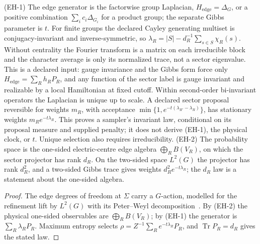 \documentclass[11pt]{article}
\begin{document}
(EH-1) The edge generator is the factorwise group Laplacian,
\(H_{\mathrm{edge}} = \Delta_G\), or a positive combination
\(\sum_ic_i\Delta_{G_i}\) for a product group; the separate Gibbs parameter is
\(t\). For finite groups the declared Cayley generating multiset is
conjugacy-invariant and inverse-symmetric, so
\(\lambda_R=|S|-d_R^{-1}\sum_{s\in S}\chi_R(s)\). Without centrality the
Fourier transform is a matrix on each irreducible block and the character
average is only its normalized trace, not a sector eigenvalue. This is a
declared input: gauge invariance and the Gibbs form force only
\(H_{\mathrm{edge}}=\sum_Rh_RP_R\), and any function of the sector label is
gauge invariant and realizable by a local Hamiltonian at fixed cutoff. Within
second-order bi-invariant operators the Laplacian is unique up to scale.
A declared sector proposal reversible for weights \(m_R\), with acceptance
\(\min\{1,e^{-t(\lambda_{R'}-\lambda_R)}\}\), has stationary weights
\(m_Re^{-t\lambda_R}\). This proves a sampler's invariant law, conditional
on its proposal measure and supplied penalty; it does not derive (EH-1),
the physical clock, or \(t\). Unique selection also requires irreducibility.
(EH-2) The probability space is the one-sided
electric-centre edge algebra \(\bigoplus_RB(V_R)\), on which the sector
projector has rank \(d_R\). On the two-sided space \(L^2(G)\) the projector has
rank \(d_R^2\), and a two-sided Gibbs trace gives weights
\(d_R^2e^{-t\lambda_R}\); the \(d_R\) law is a statement about the one-sided
algebra.

\begin{proof}
The edge degrees of freedom at \(\Sigma\) carry a \(G\)-action, modelled for the
refinement lift by \(L^2(G)\) with its Peter--Weyl
decomposition~\cite{peterWeyl27}. By (EH-2) the physical one-sided observables
are \(\bigoplus_RB(V_R)\); by (EH-1) the generator is
\(\sum_R\lambda_RP_R\). Maximum entropy selects
\(\rho=Z^{-1}\sum_Re^{-t\lambda_R}P_R\), and \(\operatorname{Tr}P_R=d_R\) gives
the stated law.
\end{proof}
\end{document}
